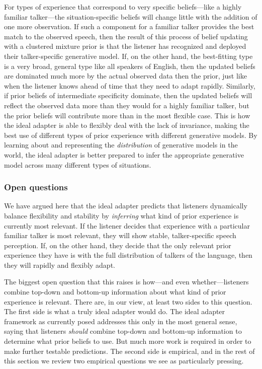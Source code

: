 For types of experience that correspond to very specific beliefs---like a highly familiar talker---the situation-specific beliefs will change little with the addition of one more observation.  If such a component for a familiar talker provides the best match to the observed speech, then the result of this process of belief updating with a clustered mixture prior is that the listener has recognized and deployed their talker-specific generative model.  If, on the other hand, the best-fitting type is a very broad, general type like all speakers of English, then the updated beliefs are dominated much more by the actual observed data then the prior, just like when the listener knows ahead of time that they need to adapt rapidly.  Similarly, if prior beliefs of intermediate specificity dominate, then the updated beliefs will reflect the observed data more than they would for a highly familiar talker, but the prior beliefs will contribute more than in the most flexible case.   This is how the ideal adapter is able to flexibly deal with the lack of invariance, making the best use of different types of prior experience with different generative models.  By learning about and representing the \emph{distribution} of generative models in the world, the ideal adapter is better prepared to infer the appropriate generative model across many different types of situations.  


\subsubsection{Open questions}
\label{sec:open-questions-infer-cluster}
\label{r1-cluster-questions}

We have argued here that the ideal adapter predicts that listeners dynamically balance flexibility and stability by \emph{inferring} what kind of prior experience is currently most relevant.  If the listener decides that experience with a particular familiar talker is most relevant, they will show stable, talker-specific speech perception.  If, on the other hand, they decide that the only relevant prior experience they have is with the full distribution of talkers of the language, then they will rapidly and flexibly adapt.  

The biggest open question that this raises is how---and even whether---listeners combine top-down and bottom-up information about what kind of prior experience is relevant.  There are, in our view, at least two sides to this question.  The first side is what a truly ideal adapter would do.  The ideal adapter framework as currently posed addresses this only in the most general sense, saying that listeners \emph{should} combine top-down and bottom-up information to determine what prior beliefs to use.  But much more work is required in order to make further testable predictions.  The second side is empirical, and in the rest of this section we review two empirical questions we see as particularly pressing.

